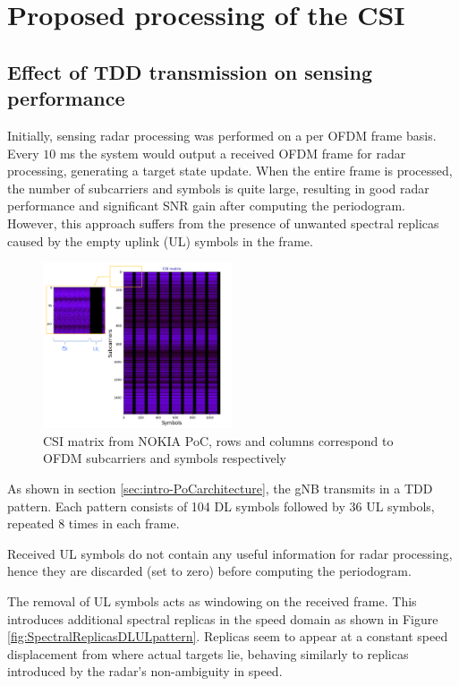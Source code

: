 \chapter{Proposed processing of the CSI}
\label{chap:TDD pattern of the OFDM frame}

\section{Effect of TDD transmission on sensing performance}

	Initially, sensing radar processing was performed on a per OFDM frame basis. \protect\newline Every $10$ ms the system would output a received OFDM frame for radar processing, generating a target state update. When the entire frame is processed, the number of subcarriers and symbols is quite large, resulting in good radar performance and significant SNR gain after computing the periodogram. However, this approach suffers from the presence of unwanted spectral replicas caused by the empty uplink (UL) symbols in the frame.
	
	\begin{figure}[H]
	    \centering
	    \includegraphics[width=0.5\textwidth]{Images/TDDprocessing/CSIMatrix_DLULpattern.png}
	    \caption{CSI matrix from NOKIA PoC, rows and columns correspond to OFDM subcarriers and symbols respectively}
	    \label{fig:CSIMatrix_DLULpattern}
	\end{figure}
	
	As shown in section \ref{sec:intro-PoCarchitecture}, the gNB transmits in a TDD pattern. Each pattern consists of 104 DL symbols followed by 36 UL symbols, repeated 8 times in each frame.
	
	Received UL symbols do not contain any useful information for radar processing, hence they are discarded (set to zero) before computing the periodogram.
	    
    The removal of UL symbols acts as windowing on the received frame. This introduces additional spectral replicas in the speed domain as shown in Figure \ref{fig:SpectralReplicasDLULpattern}. Replicas seem to appear at a constant speed displacement from where actual targets lie, behaving similarly to replicas introduced by the radar's non-ambiguity in speed.
    
